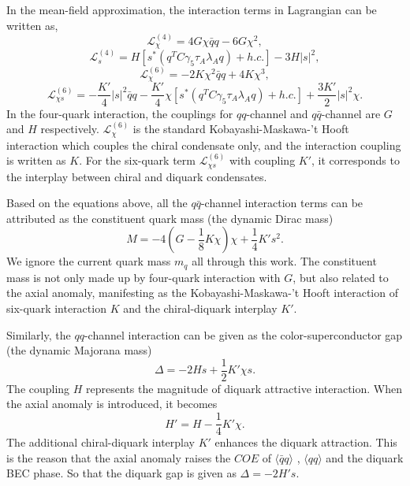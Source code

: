 \documentclass[prd, showpacs,nofootinbib,amsmath,amssymb,12pt]{revtex4}
\begin{document}
In the mean-field approximation, the interaction terms in Lagrangian can be written as\cite{abuki2010nambu},  
\begin{equation}
\mathcal{L}^{(4)}_{\chi}=4G\chi\bar{q}q-6G\chi^2, 
\label{eqL4}
\end{equation}	
\begin{equation}
\mathcal{L}^{(4)}_{s}=H[s^*(q^TC\gamma_5\tau_A\lambda_Aq)+h.c.]-3H|s|^2, 
\label{eqL4s}
\end{equation}
\begin{equation}
\mathcal{L}^{\left(6\right)}_{\chi}=-2K\chi^2\bar{q}q+4K\chi^3, 
\label{eqL6chi}
\end{equation}
\begin{equation}
\mathcal{L}^{\left(6\right)}_{\chi s}=-\frac{K'}{4}|s|^2\bar{q}q-\frac{K'}{4}\chi[s^*(q^TC\gamma_5\tau_A\lambda_Aq)+h.c.]+\frac{3K'}{2}|s|^2\chi.
\label{eqL6chis}
\end{equation}
In the four-quark interaction, the couplings for $qq$-channel and $q\bar{q}$-channel are $G$ and $H$ respectively.
$\mathcal{L}^{\left(6\right)}_{\chi}$ is the standard Kobayashi-Maskawa-'t Hooft interaction which couples the chiral condensate only, 
and the interaction coupling is written as $K$.
For the six-quark term $\mathcal{L}^{\left(6\right)}_{\chi s}$ with coupling $K'$, it corresponds to the interplay between chiral and diquark condensates.

Based on the equations above, 
all the $q\bar{q}$-channel interaction terms can be attributed as  the constituent quark mass (the dynamic Dirac mass)
\begin{equation}
M = -4(G-\frac{1}{8}K\chi)\chi + \frac{1}{4}K's^2.
\label{Dmass}
\end{equation}
We ignore the current quark mass $m_q$ all through this work.
The constituent mass is not only made up by four-quark interaction with $G$,
but also related to the axial anomaly, 
manifesting as the Kobayashi-Maskawa-'t Hooft interaction of six-quark interaction $K$ and the chiral-diquark interplay $K'$. 

Similarly, the $qq$-channel  interaction can be given as the color-superconductor gap (the dynamic Majorana mass)
\begin{equation}
\Delta=-2Hs+\frac{1}{2}K'\chi s.
\end{equation}
The coupling $H$ represents the magnitude of diquark attractive interaction.
When the axial anomaly is introduced, it becomes
\begin{equation}
\label{eq:effectivecoupling}
H'=H - \frac{1}{4}K'\chi.
\end{equation}
The additional chiral-diquark interplay $K'$ enhances the diquark attraction. 
This is the reason that the axial anomaly raises the $COE$ of $\langle\bar{q}q\rangle$ , $\langle qq\rangle$ and the diquark BEC phase.
So that the diquark gap is given as $\Delta=-2H's$. 
\end{document}
